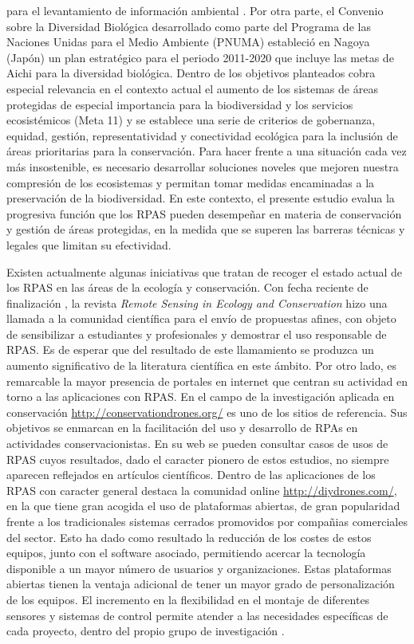 \documentclass[11pt,]{article}
\begin{document}
para el levantamiento de información ambiental \citep{Forum2008}. Por
otra parte, el Convenio sobre la Diversidad Biológica desarrollado como
parte del Programa de las Naciones Unidas para el Medio Ambiente (PNUMA)
estableció en Nagoya (Japón) un plan estratégico para el periodo
2011-2020 que incluye las metas de Aichi para la diversidad biológica.
Dentro de los objetivos planteados cobra especial relevancia en el
contexto actual el aumento de los sistemas de áreas protegidas de
especial importancia para la biodiversidad y los servicios ecosistémicos
(Meta 11) y se establece una serie de criterios de gobernanza, equidad,
gestión, representatividad y conectividad ecológica para la inclusión de
áreas prioritarias para la conservación. Para hacer frente a una
situación cada vez más insostenible, es necesario desarrollar soluciones
noveles que mejoren nuestra compresión de los ecosistemas y permitan
tomar medidas encaminadas a la preservación de la biodiversidad. En este
contexto, el presente estudio evalua la progresiva función que los RPAS
pueden desempeñar en materia de conservación y gestión de áreas
protegidas, en la medida que se superen las barreras técnicas y legales
que limitan su efectividad.

Existen actualmente algunas iniciativas que tratan de recoger el estado
actual de los RPAS en las áreas de la ecología y conservación. Con fecha
reciente de finalización , la revista \emph{Remote Sensing in Ecology
and Conservation} hizo una llamada a la comunidad científica para el
envío de propuestas afines, con objeto de sensibilizar a estudiantes y
profesionales y demostrar el uso responsable de RPAS. Es de esperar que
del resultado de este llamamiento se produzca un aumento significativo
de la literatura científica en este ámbito. Por otro lado, es remarcable
la mayor presencia de portales en internet que centran su actividad en
torno a las aplicaciones con RPAS. En el campo de la investigación
aplicada en conservación \url{http://conservationdrones.org/} es uno de
los sitios de referencia. Sus objetivos se enmarcan en la facilitación
del uso y desarrollo de RPAs en actividades conservacionistas. En su web
se pueden consultar casos de usos de RPAS cuyos resultados, dado el
caracter pionero de estos estudios, no siempre aparecen reflejados en
artículos científicos. Dentro de las aplicaciones de los RPAS con
caracter general destaca la comunidad online
\url{http://diydrones.com/}, en la que tiene gran acogida el uso de
plataformas abiertas, de gran popularidad frente a los tradicionales
sistemas cerrados promovidos por compañias comerciales del sector. Esto
ha dado como resultado la reducción de los costes de estos equipos,
junto con el software asociado, permitiendo acercar la tecnología
disponible a un mayor número de usuarios y organizaciones. Estas
plataformas abiertas tienen la ventaja adicional de tener un mayor grado
de personalización de los equipos. El incremento en la flexibilidad en
el montaje de diferentes sensores y sistemas de control permite atender
a las necesidades específicas de cada proyecto, dentro del propio grupo
de investigación \citep{Koh2012}.
\end{document}
